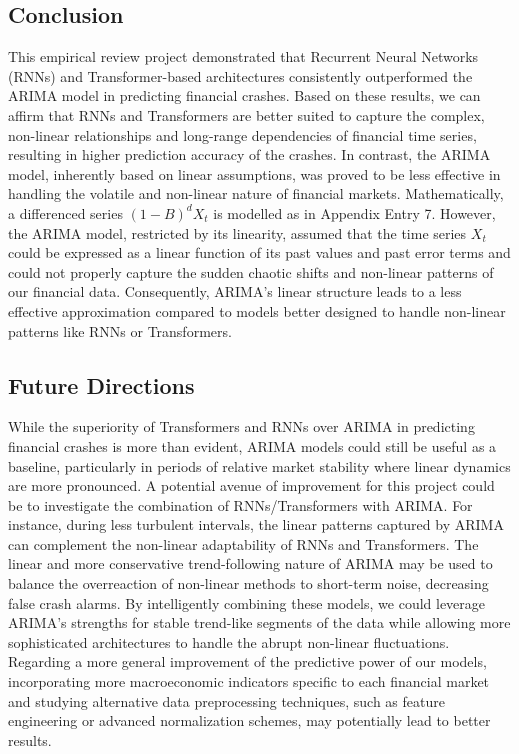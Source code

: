 \documentclass[12pt, letterpaper]{article}
\begin{document}
\subsection*{Conclusion}
This empirical review project demonstrated that Recurrent Neural Networks (RNNs) and Transformer-based architectures consistently outperformed the ARIMA model in predicting financial crashes. Based on these results, we can affirm that RNNs and Transformers are better suited to capture the complex, non-linear relationships and long-range dependencies of financial time series, resulting in higher prediction accuracy of the crashes. In contrast, the ARIMA model, inherently based on linear assumptions, was  proved to be less effective in handling the volatile and non-linear nature of financial markets. Mathematically, a differenced series \((1-B)^d X_t\) is modelled as in Appendix Entry 7. 
However, the ARIMA model, restricted by its linearity, assumed that the time series $X_t$ could be expressed as a linear function of its past values and past error terms and could not properly capture the sudden chaotic shifts and non-linear patterns of our financial data. Consequently, ARIMA’s linear structure leads to a less effective approximation compared to models better designed to handle non-linear patterns like RNNs or Transformers.



\subsection*{Future Directions}
While the superiority of Transformers and RNNs over ARIMA in predicting financial crashes is more than evident, ARIMA models could still be useful as a baseline, particularly in periods of relative market stability where linear dynamics are more pronounced. A potential avenue of improvement for this project could be to investigate the combination of RNNs/Transformers with ARIMA. For instance, during less turbulent intervals, the linear patterns captured by ARIMA can complement the non-linear adaptability of RNNs and Transformers. The linear and more conservative trend-following nature of ARIMA may be used to balance the overreaction of non-linear methods to short-term noise, decreasing false crash alarms. By intelligently combining these models, we could leverage ARIMA’s strengths for stable trend-like segments of the data while allowing more sophisticated architectures to handle the abrupt non-linear fluctuations. Regarding a more general improvement of the predictive power of our models, incorporating more macroeconomic indicators specific to each financial market and studying alternative data preprocessing techniques, such as feature engineering or advanced normalization schemes, may potentially lead to better results.
\end{document}
